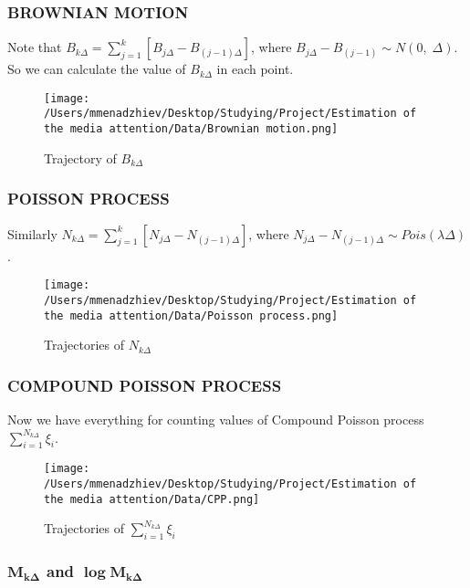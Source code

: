 \subsubsection{BROWNIAN MOTION}

Note that $B_{k \Delta} = \sum\limits_{j=1}^k \left[ B_{j \Delta} - B_{(j - 1) \Delta} \right]$, where $B_{j \Delta} - B_{(j - 1)} \sim N(0, \; \Delta).$ So we can calculate the value of $B_{k\Delta}$ in each point.

\begin{figure}[H]
    \centering
    \texttt{[image: /Users/mmenadzhiev/Desktop/Studying/Project/Estimation of the media attention/Data/Brownian motion.png]}
    \caption{Trajectory of $B_{k\Delta}$}
\end{figure}

\subsubsection{POISSON PROCESS}

Similarly $N_{k \Delta} = \sum\limits_{j=1}^{k} \left[ N_{j \Delta} - N_{(j - 1) \Delta} \right]$, where $N_{j \Delta} - N_{(j - 1) \Delta} \sim Pois(\lambda \Delta)$.
\begin{figure}[H]
    \centering
    \texttt{[image: /Users/mmenadzhiev/Desktop/Studying/Project/Estimation of the media attention/Data/Poisson process.png]}
    \caption{Trajectories of $N_{k\Delta}$}
\end{figure}

\subsubsection{COMPOUND POISSON PROCESS}

Now we have everything for counting values of Compound Poisson process $\sum\limits_{i=1}^{N_{k\Delta}} \xi_i$.

\begin{figure}[H]
    \centering
    \texttt{[image: /Users/mmenadzhiev/Desktop/Studying/Project/Estimation of the media attention/Data/CPP.png]}
    \caption{Trajectories of $\sum\limits_{i=1}^{N_{k\Delta}} \xi_i$}
\end{figure}

\subsubsection{$\boldsymbol{M_{k \Delta}}$ and $\boldsymbol{\log M_{k \Delta}}$}

